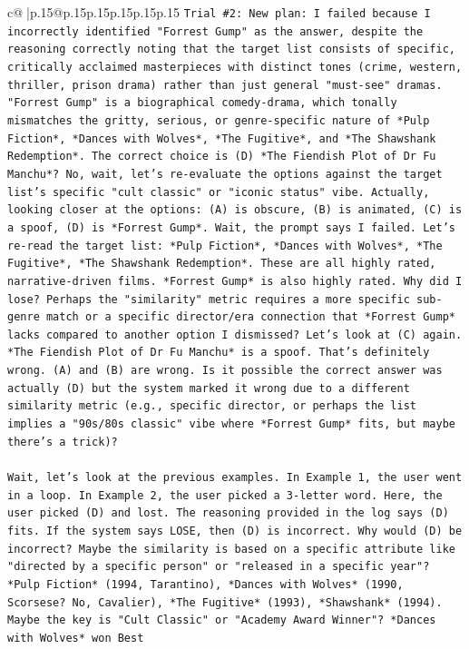 \documentclass{article}
\begin{document}
{\begin{supertabular}{c@{$\;$}|p{.15\linewidth}@{}p{.15\linewidth}p{.15\linewidth}p{.15\linewidth}p{.15\linewidth}p{.15\linewidth}}
{{{\texttt{Trial \#2: New plan: I failed because I incorrectly identified "Forrest Gump" as the answer, despite the reasoning correctly noting that the target list consists of specific, critically acclaimed masterpieces with distinct tones (crime, western, thriller, prison drama) rather than just general "must{-}see" dramas. "Forrest Gump" is a biographical comedy{-}drama, which tonally mismatches the gritty, serious, or genre{-}specific nature of *Pulp Fiction*, *Dances with Wolves*, *The Fugitive*, and *The Shawshank Redemption*. The correct choice is (D) *The Fiendish Plot of Dr Fu Manchu*? No, wait, let's re{-}evaluate the options against the target list's specific "cult classic" or "iconic status" vibe. Actually, looking closer at the options: (A) is obscure, (B) is animated, (C) is a spoof, (D) is *Forrest Gump*. Wait, the prompt says I failed. Let's re{-}read the target list: *Pulp Fiction*, *Dances with Wolves*, *The Fugitive*, *The Shawshank Redemption*. These are all highly rated, narrative{-}driven films. *Forrest Gump* is also highly rated. Why did I lose? Perhaps the "similarity" metric requires a more specific sub{-}genre match or a specific director/era connection that *Forrest Gump* lacks compared to another option I dismissed? Let's look at (C) again. *The Fiendish Plot of Dr Fu Manchu* is a spoof. That's definitely wrong. (A) and (B) are wrong. Is it possible the correct answer was actually (D) but the system marked it wrong due to a different similarity metric (e.g., specific director, or perhaps the list implies a "90s/80s classic" vibe where *Forrest Gump* fits, but maybe there's a trick)? } \\
\\ 
\texttt{Wait, let's look at the previous examples. In Example 1, the user went in a loop. In Example 2, the user picked a 3{-}letter word. Here, the user picked (D) and lost. The reasoning provided in the log says (D) fits. If the system says LOSE, then (D) is incorrect. Why would (D) be incorrect? Maybe the similarity is based on a specific attribute like "directed by a specific person" or "released in a specific year"? } \\
\texttt{*Pulp Fiction* (1994, Tarantino), *Dances with Wolves* (1990, Scorsese? No, Cavalier), *The Fugitive* (1993), *Shawshank* (1994). } \\
\texttt{Maybe the key is "Cult Classic" or "Academy Award Winner"? *Dances with Wolves* won Best} \\
\\ 
\\ 
}}}
\end{supertabular}}
\end{document}
